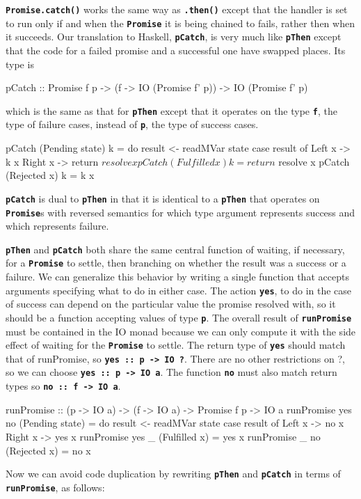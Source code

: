 \documentclass[12pt, english, letterpaper]{kuthesis}
\newcommand{\lit}[1]{\textbf{\texttt{#1}}}
\begin{document}
 \lit{Promise.catch()} works the same way as \lit{.then()} except that the handler is set to run only if and when the \lit{Promise} it is being chained to fails, rather then when it succeeds.  Our translation to Haskell, \lit{pCatch}, is very much like \lit{pThen} except that the code for a failed promise and a successful one have swapped places.  Its type is
 \begin{code}
pCatch :: Promise f p
        -> (f -> IO (Promise f' p))
        -> IO (Promise f' p)
\end{code}
which is the same as that for \lit{pThen} except that it operates on the type \lit f, the type of failure cases, instead of \lit p, the type of success cases.
\begin{code}
pCatch (Pending state) k = do
  result <- readMVar state
  case result of
    Left x -> k x
    Right x -> return $ resolve x
pCatch (Fulfilled x) k = return $ resolve x
pCatch (Rejected x) k = k x
\end{code}
\lit{pCatch} is dual to \lit{pThen} in that it is identical to a \lit{pThen} that operates on \lit{Promise}s with reversed semantics for which type argument represents success and which represents failure.

\lit{pThen} and \lit{pCatch} both share the same central function of waiting, if necessary, for a \lit{Promise} to settle, then branching on whether the result was a success or a failure.  We can generalize this behavior by writing a single function that accepts arguments specifying what to do in either case.  The action \lit{yes}, to do in the case of success can depend on the particular value the promise resolved with, so it should be a function accepting values of type \lit p.  The overall result of \lit{runPromise} must be contained in the IO monad because we can only compute it with the side effect of waiting for the \lit{Promise} to settle.  The return type of \lit{yes} should match that of runPromise, so \lit{yes ::\ p -> IO ?}.  There are no other restrictions on ?, so we can choose \lit{yes ::\ p -> IO a}. The function \lit{no} must also match return types so \lit{no ::\ f -> IO a}.

\begin{code}
runPromise :: (p -> IO a) -> (f -> IO a) -> Promise f p -> IO a
runPromise yes no (Pending state) = do
  result <- readMVar state
  case result of
    Left x -> no x
    Right x -> yes x
runPromise yes _ (Fulfilled x) = yes x
runPromise _ no (Rejected x) = no x
\end{code}
Now we can avoid code duplication by rewriting \lit{pThen} and \lit{pCatch} in terms of \lit{runPromise}, as follows:
\end{document}
